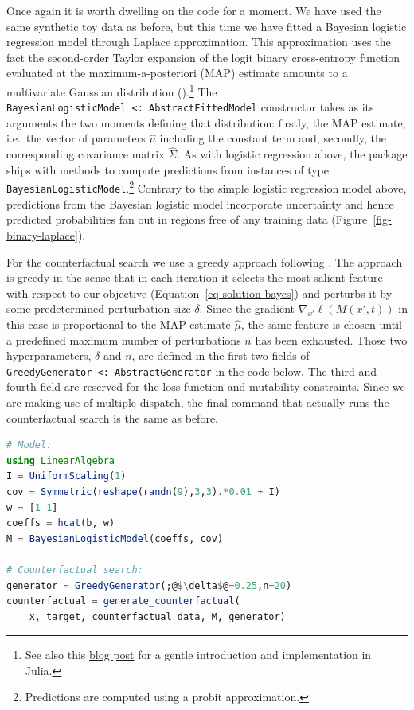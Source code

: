 \documentclass{juliacon}
\begin{document}
Once again it is worth dwelling on the code for a moment. We have used
the same synthetic toy data as before, but this time we have fitted a
Bayesian logistic regression model through Laplace approximation. This
approximation uses the fact the second-order Taylor expansion of the
logit binary cross-entropy function evaluated at the
maximum-a-posteriori (MAP) estimate amounts to a multivariate Gaussian
distribution (\cite{murphy2022probabilistic}).\footnote{See also this
  \href{https://www.paltmeyer.com/blog/posts/effortsless-bayesian-dl/}{blog
  post} for a gentle introduction and implementation in Julia.} The
\texttt{BayesianLogisticModel\ \textless{}:\ AbstractFittedModel}
constructor takes as its arguments the two moments defining that
distribution: firstly, the MAP estimate, i.e.~the vector of parameters
\(\hat\mu\) including the constant term and, secondly, the corresponding
covariance matrix \(\hat{\Sigma}\). As with logistic regression above,
the package ships with methods to compute predictions from instances of
type \texttt{BayesianLogisticModel}.\footnote{Predictions are computed
  using a probit approximation.} Contrary to the simple logistic
regression model above, predictions from the Bayesian logistic model
incorporate uncertainty and hence predicted probabilities fan out in
regions free of any training data (Figure~\ref{fig-binary-laplace}).

For the counterfactual search we use a greedy approach following
\cite{schut2021generating}. The approach is greedy in the sense that in
each iteration it selects the most salient feature with respect to our
objective (Equation~\ref{eq-solution-bayes}) and perturbs it by some
predetermined perturbation size \(\delta\). Since the gradient
\(\nabla_{x\prime}\ell(M(x\prime,t))\) in this case is proportional to
the MAP estimate \(\hat\mu\), the same feature is chosen until a
predefined maximum number of perturbations \(n\) has been exhausted.
Those two hyperparameters, \(\delta\) and \(n\), are defined in the
first two fields of
\texttt{GreedyGenerator\ \textless{}:\ AbstractGenerator} in the code
below. The third and fourth field are reserved for the loss function and
mutability constraints. Since we are making use of multiple dispatch,
the final command that actually runs the counterfactual search is the
same as before.

\begin{lstlisting}[language=Julia, escapechar=@]
# Model:
using LinearAlgebra
I = UniformScaling(1)
cov = Symmetric(reshape(randn(9),3,3).*0.01 + I) 
w = [1 1]
coeffs = hcat(b, w)
M = BayesianLogisticModel(coeffs, cov)

# Counterfactual search:
generator = GreedyGenerator(;@$\delta$@=0.25,n=20)
counterfactual = generate_counterfactual(
    x, target, counterfactual_data, M, generator)
\end{lstlisting}
\end{document}
